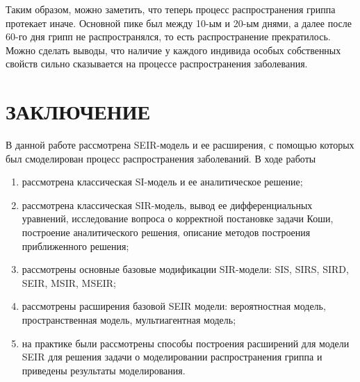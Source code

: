 \documentclass[a4paper, 14pt]{extreport}
\numberwithin{equation}{section}
\begin{document}
	Таким образом, можно заметить, что теперь процесс распространения гриппа протекает иначе. Основной пике был между 10-ым и 20-ым днями, а далее после 60-го дня грипп не распространялся, то есть распространение прекратилось. Можно сделать выводы, что наличие у каждого индивида особых собственных свойств сильно сказывается на процессе распространения заболевания.
	
	
	\chapter*{ЗАКЛЮЧЕНИЕ}
	В данной работе рассмотрена SEIR-модель и ее расширения, с помощью которых был смоделирован процесс распространения заболеваний.
	В ходе работы
	\begin{enumerate}
		\item рассмотрена классическая SI-модель и ее аналитическое решение;
		\item рассмотрена классическая SIR-модель, вывод ее дифференциальных уравнений, исследование вопроса о корректной постановке задачи Коши, построение аналитического решения, описание методов построения приближенного решения;
		\item рассмотрены основные базовые модификации SIR-модели: SIS, SIRS, SIRD, SEIR, MSIR, MSEIR;
		\item рассмотрены расширения базовой SEIR модели: вероятностная модель, пространственная модель, мультиагентная модель;
		\item на практике были рассмотрены способы построения расширений для модели SEIR для решения задачи о моделировании распространения гриппа и приведены результаты моделирования.
	\end{enumerate}
	
	\newpage
\end{document}
